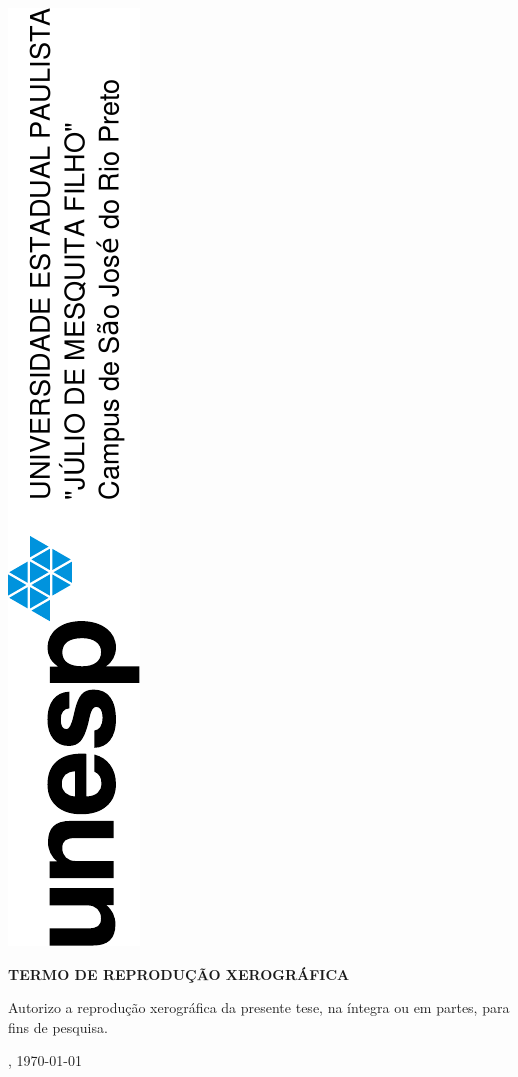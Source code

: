 \thispagestyle{empty}
\center
\centering \includegraphics[angle=-90]{unesp.pdf}
\vspace{2cm}

\begin{vplace}[1]
\par \centering \ABNTEXchapterfont\large
		\bfseries{ TERMO DE REPRODUÇÃO XEROGRÁFICA }
\end{vplace}

\begin{vplace}[1]
	\par \ABNTEXchapterfont Autorizo a reprodução xerográfica da presente tese, na íntegra ou em partes, para fins de pesquisa.
\end{vplace}

\begin{vplace}[1]
	\begin{center}
		\ABNTEXchapterfont \imprimirlocal, \today
		\ABNTEXchapterfont \assinatura{\imprimirautor}
	\end{center}
\end{vplace}



